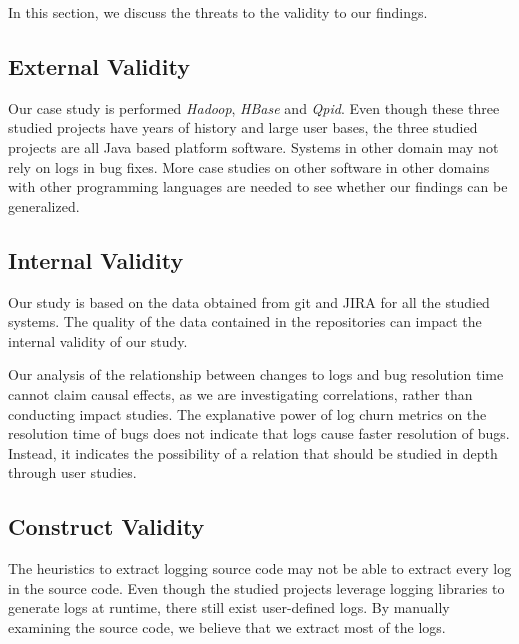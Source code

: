 
In this section, we discuss the threats to the validity to our findings.

\subsection*{External Validity}


Our case study is performed \emph{Hadoop}, \emph{HBase} and \emph{Qpid}. Even though these three studied projects have years of history and large user bases, the three studied projects are all Java based platform software. Systems in other domain may not rely on logs in bug fixes. More case studies on other software in other domains with other programming languages are needed to see whether our findings can be generalized. 




\subsection*{Internal Validity}


Our study is based on the data obtained from git and JIRA for all the studied systems. The quality of the data contained in the repositories can impact the internal validity of our study.

Our analysis of the relationship between changes to logs and bug resolution time cannot claim causal effects, as we are investigating correlations, rather than conducting impact studies. The explanative power of log churn metrics on the resolution time of bugs does not indicate that logs cause faster resolution of bugs. Instead, it indicates the possibility of a relation that should be studied in depth through user studies.


\subsection*{Construct Validity}

The heuristics to extract logging source code may not be able to extract every log in the source code. Even though the studied projects leverage logging libraries to generate logs at runtime, there still exist user-defined logs. By manually examining the source code, we believe that we extract most of the logs. %

